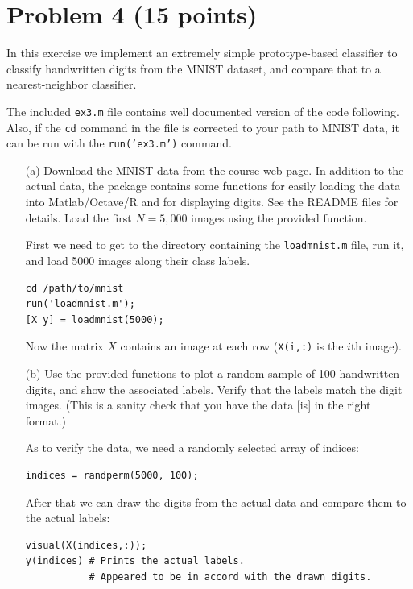 \documentclass[10pt]{article}
\begin{document}
\color{blue}
\section*{Problem 4 (15 points)}
In this exercise we implement an extremely simple prototype-based classifier to classify handwritten digits from the MNIST dataset, and compare that to a nearest-neighbor classifier.

\color{black}
The included \texttt{ex3.m} file contains well documented version of the code following. Also, if the \texttt{cd} command in the file is corrected to your path to MNIST data, it can be run with the \texttt{run('ex3.m')} command.

\color{blue}

\begin{itemize}
\item[(a)] Download the MNIST data from the course web page. In addition to the actual data, the package contains some functions for easily loading the data into Matlab/Octave/R and for displaying digits. See the README files for details. Load the first $N=5,000$ images using the provided function.

\color{black}
First we need to get to the directory containing the \texttt{loadmnist.m} file, run it, and load 5000 images along their class labels.
\begin{verbatim}
cd /path/to/mnist
run('loadmnist.m');
[X y] = loadmnist(5000);
\end{verbatim}
Now the matrix $X$ contains an image at each row (\texttt{X(i,:)} is the $i$th image).

\color{blue}
\item[(b)] Use the provided functions to plot a random sample of 100 handwritten digits, and show the associated labels. Verify that the labels match the digit images. (This is a sanity check that you have the data [is] in the right format.)

\color{black} As to verify the data, we need a randomly selected array of indices:
\begin{verbatim}
indices = randperm(5000, 100);
\end{verbatim}
After that we can draw the digits from the actual data and compare them to the actual labels:
\begin{verbatim}
visual(X(indices,:));
y(indices) # Prints the actual labels. 
           # Appeared to be in accord with the drawn digits.
\end{verbatim}


\end{itemize}
\end{document}
